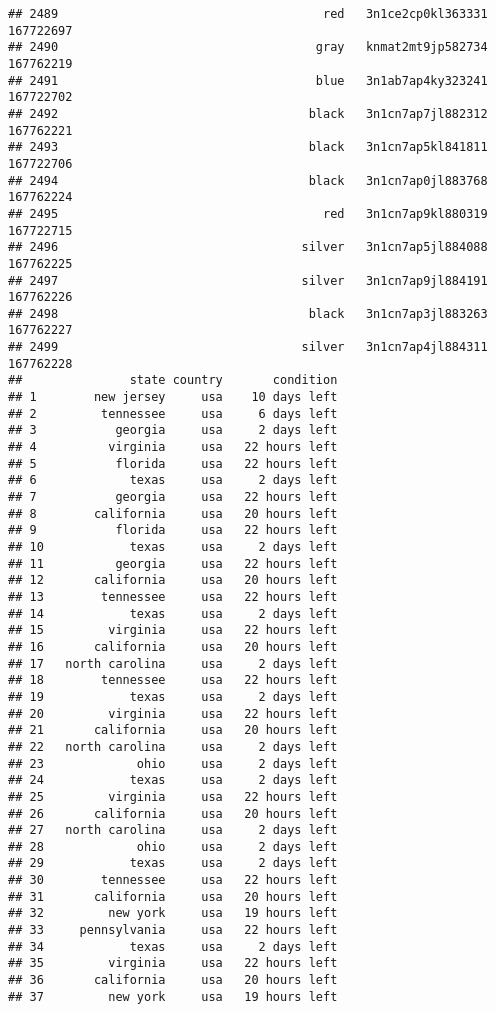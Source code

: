 \documentclass[
]{article}
\begin{document}
\begin{verbatim}
## 2489                                     red   3n1ce2cp0kl363331 167722697
## 2490                                    gray   knmat2mt9jp582734 167762219
## 2491                                    blue   3n1ab7ap4ky323241 167722702
## 2492                                   black   3n1cn7ap7jl882312 167762221
## 2493                                   black   3n1cn7ap5kl841811 167722706
## 2494                                   black   3n1cn7ap0jl883768 167762224
## 2495                                     red   3n1cn7ap9kl880319 167722715
## 2496                                  silver   3n1cn7ap5jl884088 167762225
## 2497                                  silver   3n1cn7ap9jl884191 167762226
## 2498                                   black   3n1cn7ap3jl883263 167762227
## 2499                                  silver   3n1cn7ap4jl884311 167762228
##               state country       condition
## 1        new jersey     usa    10 days left
## 2         tennessee     usa     6 days left
## 3           georgia     usa     2 days left
## 4          virginia     usa   22 hours left
## 5           florida     usa   22 hours left
## 6             texas     usa     2 days left
## 7           georgia     usa   22 hours left
## 8        california     usa   20 hours left
## 9           florida     usa   22 hours left
## 10            texas     usa     2 days left
## 11          georgia     usa   22 hours left
## 12       california     usa   20 hours left
## 13        tennessee     usa   22 hours left
## 14            texas     usa     2 days left
## 15         virginia     usa   22 hours left
## 16       california     usa   20 hours left
## 17   north carolina     usa     2 days left
## 18        tennessee     usa   22 hours left
## 19            texas     usa     2 days left
## 20         virginia     usa   22 hours left
## 21       california     usa   20 hours left
## 22   north carolina     usa     2 days left
## 23             ohio     usa     2 days left
## 24            texas     usa     2 days left
## 25         virginia     usa   22 hours left
## 26       california     usa   20 hours left
## 27   north carolina     usa     2 days left
## 28             ohio     usa     2 days left
## 29            texas     usa     2 days left
## 30        tennessee     usa   22 hours left
## 31       california     usa   20 hours left
## 32         new york     usa   19 hours left
## 33     pennsylvania     usa   22 hours left
## 34            texas     usa     2 days left
## 35         virginia     usa   22 hours left
## 36       california     usa   20 hours left
## 37         new york     usa   19 hours left

\end{verbatim}
\end{document}
